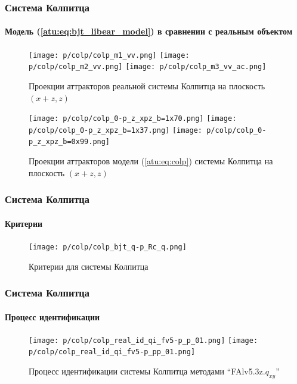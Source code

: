 \documentclass[10pt,utf8]{beamer}
\begin{document}
\begin{frame}
  \frametitle{Система Колпитца}
  \framesubtitle{Модель (\ref{atu:eq:bjt_libear_model}) в сравнении с реальным объектом}

  \begin{figure}[htb!]
   \centerline{
     \texttt{[image: p/colp/colp\_m1\_vv.png]}
     \texttt{[image: p/colp/colp\_m2\_vv.png]}
     \texttt{[image: p/colp/colp\_m3\_vv\_ac.png]}
   }
    \caption{Проекции аттракторов реальной системы Колпитца на плоскость $(x+z,z)$}
    \label{atu:f:colp_real_xzz}
  \end{figure}

  \vspace{-4ex}

  \begin{figure}[htb!]
   \centerline{
     \texttt{[image: p/colp/colp\_0-p\_z\_xpz\_b=1x70.png]}
     \texttt{[image: p/colp/colp\_0-p\_z\_xpz\_b=1x37.png]}
     \texttt{[image: p/colp/colp\_0-p\_z\_xpz\_b=0x99.png]}
   }
    \caption{Проекции аттракторов модели (\ref{atu:eq:colp}) системы Колпитца на плоскость $(x+z,z)$}
    \label{atu:f:colp_model_xzz}
  \end{figure}

\end{frame}




\begin{frame}
  \frametitle{Система Колпитца}
  \framesubtitle{Критерии}

  \begin{figure}[htb!]
    \centerline{\texttt{[image: p/colp/colp\_bjt\_q-p\_Rc\_q.png]} }
    \caption{Критерии для системы Колпитца}
    \label{atu:f:colp_q}
  \end{figure}

\end{frame}




\begin{frame}
  \frametitle{Система Колпитца}
  \framesubtitle{Процесс идентификации}


  \begin{figure}[ht!]
    \centerline{
      \texttt{[image: p/colp/colp\_real\_id\_qi\_fv5-p\_p\_01.png]}
      \texttt{[image: p/colp/colp\_real\_id\_qi\_fv5-p\_pp\_01.png]}
      \hfill
    }
    \caption{Процесс идентификации системы Колпитца методами ``FAlv5.3z.$q_{xy}$'' }
    \label{atu:f:colp_real_id0}
  \end{figure}

\end{frame}
\end{document}
